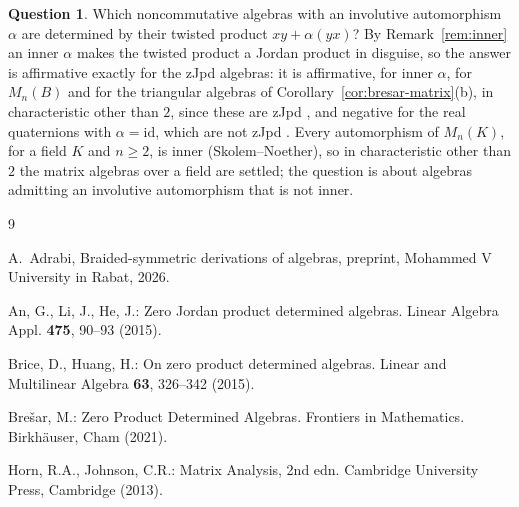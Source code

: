 \documentclass[]{interact}
\theoremstyle{plain}
\theoremstyle{definition}
\newtheorem{question}[theorem]{Question}
\theoremstyle{remark}
\begin{document}
\begin{question}\label{q:noncomm}
Which noncommutative algebras with an involutive automorphism $\alpha$ are determined by their twisted product $xy + \alpha(yx)$? %
By Remark~\ref{rem:inner} an inner $\alpha$ makes the twisted product a Jordan product in disguise, so the answer is affirmative exactly for the zJpd algebras: it is affirmative, for inner $\alpha$, for $M_n(B)$ and for the triangular algebras of Corollary~\ref{cor:bresar-matrix}(b), in characteristic other than $2$, since these are zJpd \citep[Corollary 3.17]{Bresar2021}, and negative for the real quaternions with $\alpha = \mathrm{id}$, which are not zJpd \citep[Example 3.19]{Bresar2021}. Every automorphism of $M_n(K)$, for a field $K$ and $n \ge 2$, is inner (Skolem--Noether), so in characteristic other than $2$ the matrix algebras over a field are settled; the question is about algebras admitting an involutive automorphism that is not inner.
\end{question}

\begin{thebibliography}{9}

A.~Adrabi, Braided-symmetric derivations of algebras, preprint, Mohammed V University in Rabat, 2026.

An, G., Li, J., He, J.: Zero Jordan product determined algebras. Linear Algebra Appl. \textbf{475}, 90--93 (2015).

Brice, D., Huang, H.: On zero product determined algebras. Linear and Multilinear Algebra \textbf{63}, 326--342 (2015).

Bre\v{s}ar, M.: Zero Product Determined Algebras. Frontiers in Mathematics. Birkh\"auser, Cham (2021).

Horn, R.A., Johnson, C.R.: Matrix Analysis, 2nd edn. Cambridge University Press, Cambridge (2013).

\end{thebibliography}
\end{document}
